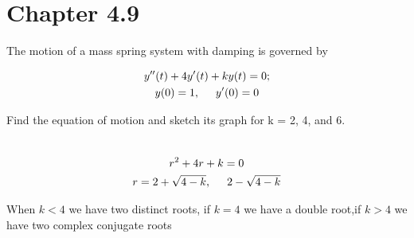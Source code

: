 \documentclass{article}
\begin{document}
    \section{Chapter 4.9}
    \begin{center}
        The motion of a mass spring system with damping is governed by
    \end{center}
    \begin{gather*}
        y''(t)+4y'(t)+ky(t)=0;\\
        y(0) = 1, \hspace{.5cm}y'(0) = 0\\
    \end{gather*}
    \begin{center}
        Find the equation of motion and sketch its graph for k = 2, 4, and 6.
    \end{center}
    \begin{gather*}
        \\
        r^2+4r+k=0\\
        r= 2 + \sqrt{4-k}, \hspace{.5cm}2 - \sqrt{4-k}\\
    \end{gather*}
    \begin{center}
        When $k < 4$ we have two distinct roots, if $k = 4$ we have a double root,if $k > 4$ we have two complex conjugate roots
    \end{center}
\end{document}
